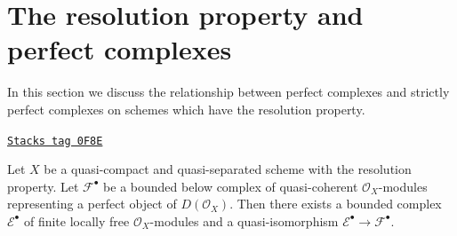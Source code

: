 \section{The resolution property and perfect complexes}
\label{perfect-section-resolution-property-perfect}
In this section we discuss the relationship between perfect complexes
and strictly perfect complexes on schemes which have the resolution property.

\begin{lemma}
\label{perfect-lemma-construct-strictly-perfect}
\href{https://stacks.math.columbia.edu/tag/0F8E}{\texttt{Stacks tag 0F8E}}

Let $X$ be a quasi-compact and quasi-separated scheme with the
resolution property.
Let $\mathcal{F}^\bullet$ be a bounded below complex of quasi-coherent
$\mathcal{O}_X$-modules representing a perfect object of
$D(\mathcal{O}_X)$. Then there exists a bounded complex
$\mathcal{E}^\bullet$ of finite locally free $\mathcal{O}_X$-modules
and a quasi-isomorphism $\mathcal{E}^\bullet \to \mathcal{F}^\bullet$.
\end{lemma}

